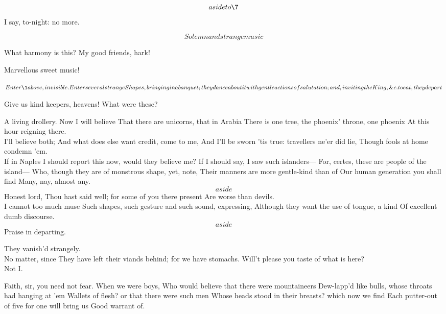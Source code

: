 \documentclass[11pt]{book}
\begin{document}
\8	\[aside to \7\]  I say, to-night: no more.

	\[Solemn and strange music\]

\6	What harmony is this? My good friends, hark!

\9	Marvellous sweet music!

	\(Enter \1 above, invisible. Enter several strange Shapes, bringing in
   a banquet; 	they dance about it with gentle actions of salutation; and,
   inviting the King, \&c. to eat, they depart\)

\6	Give us kind keepers, heavens! What were these?

\8	A living drollery. Now I will believe
	That there are unicorns, that in Arabia
	There is one tree, the phoenix' throne, one phoenix
	At this hour reigning there. \\

\7	I'll believe both;
	And what does else want credit, come to me,
	And I'll be sworn 'tis true: travellers ne'er did lie,
	Though fools at home condemn 'em. \\

\9	If in Naples
	I should report this now, would they believe me?
	If I should say, I saw such islanders---
	For, certes, these are people of the island---
	Who, though they are of monstrous shape, yet, note,
	Their manners are more gentle-kind than of
	Our human generation you shall find
	Many, nay, almost any. \\

\1	\[aside\]              Honest lord,
	Thou hast said well; for some of you there present
	Are worse than devils. \\

\6	I cannot too much muse
	Such shapes, such gesture and such sound, expressing,
	Although they want the use of tongue, a kind
	Of excellent dumb discourse. \\

\1	\[aside\]	Praise in departing.

	They vanish'd strangely. \\

\8	No matter, since
	They have left their viands behind; for we have stomachs.
	Will't please you taste of what is here? \\

\6	Not I.

\9	Faith, sir, you need not fear. When we were boys,
	Who would believe that there were mountaineers
	Dew-lapp'd like bulls, whose throats had hanging at 'em
	Wallets of flesh? or that there were such men
	Whose heads stood in their breasts? which now we find
	Each putter-out of five for one will bring us
	Good warrant of. \\
\end{document}
